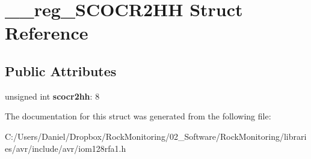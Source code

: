 \hypertarget{struct____reg___s_c_o_c_r2_h_h}{}\section{\+\_\+\+\_\+reg\+\_\+\+S\+C\+O\+C\+R2\+HH Struct Reference}
\label{struct____reg___s_c_o_c_r2_h_h}
\subsection*{Public Attributes}
\begin{DoxyCompactItemize}
\item 
unsigned int {\bfseries scocr2hh}\+: 8\hypertarget{struct____reg___s_c_o_c_r2_h_h_a820e561c31cb26cf591900599617b058}{}\label{struct____reg___s_c_o_c_r2_h_h_a820e561c31cb26cf591900599617b058}

\end{DoxyCompactItemize}


The documentation for this struct was generated from the following file\+:\begin{DoxyCompactItemize}
\item 
C\+:/\+Users/\+Daniel/\+Dropbox/\+Rock\+Monitoring/02\+\_\+\+Software/\+Rock\+Monitoring/libraries/avr/include/avr/iom128rfa1.\+h\end{DoxyCompactItemize}
